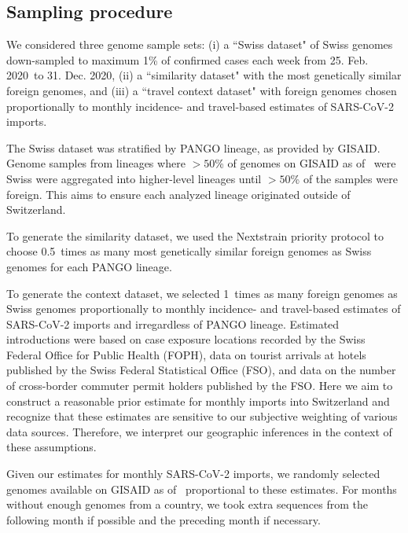 \documentclass[9pt,twocolumn,twoside,lineno]{pnas-new}
\newcommand\mindate{25. Feb. 2020}
\newcommand\maxdate{31. Dec. 2020}
\newcommand\maxsamplingpercent{1}
\newcommand\gensimscalefactor{0.5}
\newcommand\travelcontextscalefactor{1}
\begin{document}
\subsection{Sampling procedure}

We considered three genome sample sets: (i) a ``Swiss dataset" of Swiss genomes down-sampled to maximum \maxsamplingpercent\% of confirmed cases each week from \mindate\ to \maxdate, (ii) a ``similarity dataset" with the most genetically similar foreign genomes, and (iii) a ``travel context dataset" with foreign genomes chosen proportionally to monthly incidence- and travel-based estimates of SARS-CoV-2 imports.  

The Swiss dataset was stratified by PANGO lineage, as provided by GISAID. Genome samples from lineages where $>50$\% of genomes on GISAID as of \GISAIDpulldate\ were Swiss were aggregated into higher-level lineages until $>50$\% of the samples were foreign. This aims to ensure each analyzed lineage originated outside of Switzerland.

To generate the similarity dataset, we used the Nextstrain priority protocol to choose \gensimscalefactor\ times as many most genetically similar foreign genomes as Swiss genomes for each PANGO lineage. 

To generate the context dataset, we selected \travelcontextscalefactor\ times as many foreign genomes as Swiss genomes proportionally to monthly incidence- and travel-based estimates of SARS-CoV-2 imports and irregardless of PANGO lineage. Estimated introductions were based on case exposure locations recorded by the Swiss Federal Office for Public Health (FOPH), data on tourist arrivals at hotels published by the Swiss Federal Statistical Office (FSO), and data on the number of cross-border commuter permit holders published by the FSO. Here we aim to construct a reasonable prior estimate for monthly imports into Switzerland and recognize that these estimates are sensitive to our subjective weighting of various data sources. Therefore, we interpret our geographic inferences in the context of these assumptions.

Given our estimates for monthly SARS-CoV-2 imports, we randomly selected genomes available on GISAID as of \GISAIDpulldate\ proportional to these estimates. For months without enough genomes from a country, we took extra sequences from the following month if possible and the preceding month if necessary. 
\end{document}
